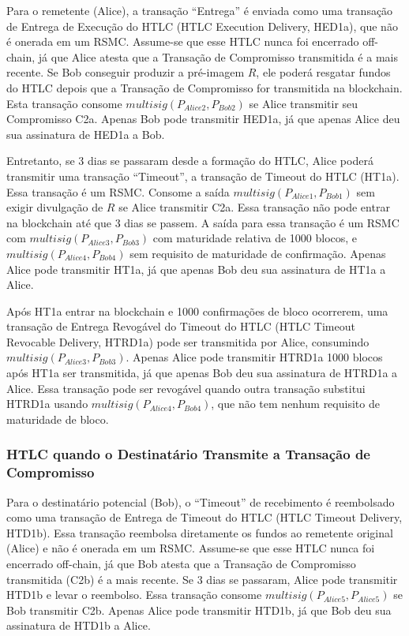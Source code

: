 \documentclass[letterpaper,11pt]{article}
\begin{document}
Para o remetente (Alice), a transação ``Entrega'' é enviada como uma
transação de Entrega de Execução do HTLC (HTLC Execution Delivery, HED1a),
que não é onerada em um RSMC. Assume-se que esse HTLC nunca foi encerrado
off-chain, já que Alice atesta que a Transação de Compromisso transmitida é
a mais recente. Se Bob conseguir produzir a pré-imagem $R$, ele poderá
resgatar fundos do HTLC depois que a Transação de Compromisso for
transmitida na blockchain. Esta transação consome $multisig(P_{Alice2},
P_{Bob2})$ se Alice transmitir seu Compromisso C2a. Apenas Bob pode
transmitir HED1a, já que apenas Alice deu sua assinatura de HED1a a Bob.

Entretanto, se 3 dias se passaram desde a formação do HTLC, Alice poderá
transmitir uma transação ``Timeout'', a transação de Timeout do HTLC
(HT1a). Essa transação é um RSMC. Consome a saída $multisig(P_{Alice1},
P_{Bob1})$ sem exigir divulgação de $R$ se Alice transmitir C2a. Essa
transação não pode entrar na blockchain até que 3 dias se passem. A saída
para essa transação é um RSMC com $multisig(P_{Alice3}, P_{Bob3})$ com
maturidade relativa de 1000 blocos, e $multisig(P_{Alice4}, P_{Bob4})$ sem
requisito de maturidade de confirmação. Apenas Alice pode transmitir HT1a,
já que apenas Bob deu sua assinatura de HT1a a Alice.

Após HT1a entrar na blockchain e 1000 confirmações de bloco ocorrerem, uma
transação de Entrega Revogável do Timeout do HTLC (HTLC Timeout Revocable
Delivery, HTRD1a) pode ser transmitida por Alice, consumindo
$multisig(P_{Alice3}, P_{Bob3})$. Apenas Alice pode transmitir HTRD1a 1000
blocos após HT1a ser transmitida, já que apenas Bob deu sua assinatura de
HTRD1a a Alice. Essa transação pode ser revogável quando outra transação
substitui HTRD1a usando $multisig(P_{Alice4}, P_{Bob4})$, que não tem
nenhum requisito de maturidade de bloco.

\subsubsection{HTLC quando o Destinatário Transmite a Transação de Compromisso}

Para o destinatário potencial (Bob), o ``Timeout'' de recebimento é
reembolsado como uma transação de Entrega de Timeout do HTLC (HTLC Timeout
Delivery, HTD1b). Essa transação reembolsa diretamente os fundos ao
remetente original (Alice) e não é onerada em um RSMC. Assume-se que esse
HTLC nunca foi encerrado off-chain, já que Bob atesta que a Transação de
Compromisso transmitida (C2b) é a mais recente. Se 3 dias se passaram,
Alice pode transmitir HTD1b e levar o reembolso. Essa transação consome
$multisig(P_{Alice5}, P_{Alice5})$ se Bob transmitir C2b. Apenas Alice pode
transmitir HTD1b, já que Bob deu sua assinatura de HTD1b a Alice.
\end{document}
